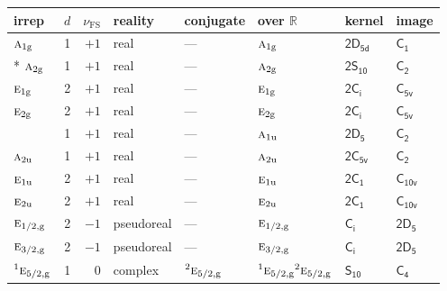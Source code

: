 \documentclass[10pt,a4paper]{article}
\makeatletter
\def\grouprule#1#2{\noalign{\marks\LTgroupmarks{\the\belowrulesep}\nobreak\vskip#1%
  \vskip\aboverulesep}\multispan\LT@cols\unskip{\leaders\hrule\@height#2\hfill\kern\z@}\cr
  \noalign{\penalty\LTrulebreak\vskip\belowrulesep\global\@lastruleclass\z@}}
\numberwithin{equation}{section}
\newcommand{\grp}[1]{\mathsf{#1}}
\newcommand{\irr}[1]{\text{\normalfont\scshape #1}}
\newcommand{\conjpair}[1]{{}^{#1}}
\newcommand{\detbox}[1]{{\setlength{\fboxsep}{1pt}\fbox{#1}}}
\newcommand{\ptag}[1]{\mathrm{#1}}
\newcommand{\fsind}{\nu_{\mathrm{FS}}}
\makeatother
\begin{document}
{\small\renewcommand{\arraystretch}{1.25}\setlength{\tabcolsep}{4pt}\begin{longtable}{@{}lrrlllll@{}}\toprule
irrep & $d$ & $\fsind$ & reality & conjugate & over $\mathbb{R}$ & kernel & image\\\midrule\endhead
\bottomrule\endfoot\endlastfoot
$\irr{a}_{1\ptag{g}}$ & 1 & $+1$ & real & --- & $\irr{a}_{1\ptag{g}}$ & \href{2D5d.pdf}{$\grp{2D_{5d}}$} & \href{../../../rotation/data/pdf/C1.pdf}{$\grp{C_{1}}$}\\*
$\irr{a}_{2\ptag{g}}$ & 1 & $+1$ & real & --- & $\irr{a}_{2\ptag{g}}$ & \href{2S10.pdf}{$\grp{2S_{10}}$} & \href{../../../rotation/data/pdf/C2.pdf}{$\grp{C_{2}}$}\\
$\irr{e}_{1\ptag{g}}$ & 2 & $+1$ & real & --- & $\irr{e}_{1\ptag{g}}$ & \href{2S2.pdf}{$\grp{2C_{i}}$} & \href{../../../rotation/data/pdf/C5v.pdf}{$\grp{C_{5v}}$}\\
$\irr{e}_{2\ptag{g}}$ & 2 & $+1$ & real & --- & $\irr{e}_{2\ptag{g}}$ & \href{2S2.pdf}{$\grp{2C_{i}}$} & \href{../../../rotation/data/pdf/C5v.pdf}{$\grp{C_{5v}}$}\\
\detbox{$\irr{a}_{1\ptag{u}}$} & 1 & $+1$ & real & --- & $\irr{a}_{1\ptag{u}}$ & \href{2D5.pdf}{$\grp{2D_{5}}$} & \href{../../../rotation/data/pdf/C2.pdf}{$\grp{C_{2}}$}\\
$\irr{a}_{2\ptag{u}}$ & 1 & $+1$ & real & --- & $\irr{a}_{2\ptag{u}}$ & \href{2C5v.pdf}{$\grp{2C_{5v}}$} & \href{../../../rotation/data/pdf/C2.pdf}{$\grp{C_{2}}$}\\
$\irr{e}_{1\ptag{u}}$ & 2 & $+1$ & real & --- & $\irr{e}_{1\ptag{u}}$ & \href{2C1.pdf}{$\grp{2C_{1}}$} & \href{../../../rotation/data/pdf/C10v.pdf}{$\grp{C_{10v}}$}\\
$\irr{e}_{2\ptag{u}}$ & 2 & $+1$ & real & --- & $\irr{e}_{2\ptag{u}}$ & \href{2C1.pdf}{$\grp{2C_{1}}$} & \href{../../../rotation/data/pdf/C10v.pdf}{$\grp{C_{10v}}$}\\
\grouprule{0pt}{\lightrulewidth}
$\irr{e}_{1/2,\ptag{g}}$ & 2 & $-1$ & pseudoreal & --- & $\irr{e}_{1/2,\ptag{g}}$ & \href{S2.pdf}{$\grp{C_{i}}$} & \href{2D5.pdf}{$\grp{2D_{5}}$}\\
$\irr{e}_{3/2,\ptag{g}}$ & 2 & $-1$ & pseudoreal & --- & $\irr{e}_{3/2,\ptag{g}}$ & \href{S2.pdf}{$\grp{C_{i}}$} & \href{2D5.pdf}{$\grp{2D_{5}}$}\\
$\conjpair{1}\irr{e}_{5/2,\ptag{g}}$ & 1 & $0$ & complex & $\conjpair{2}\irr{e}_{5/2,\ptag{g}}$ & $\conjpair{1}\irr{e}_{5/2,\ptag{g}}\conjpair{2}\irr{e}_{5/2,\ptag{g}}$ & \href{S10.pdf}{$\grp{S_{10}}$} & \href{../../../rotation/data/pdf/C4.pdf}{$\grp{C_{4}}$}\\

\end{longtable}}
\end{document}
